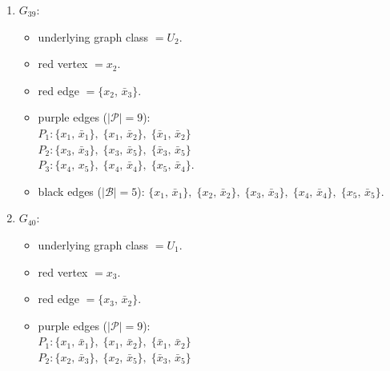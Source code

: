 \begin{enumerate}[leftmargin=*]
\begin{itemize}[leftmargin=*]
\item purple edges ($|\mathcal{P}|=9$):\mbox{}\\
$P_{1}: \{x_{1},\,\bar{x}_{1}\},\; \{x_{1},\,\bar{x}_{2}\},\; \{\bar{x}_{1},\,\bar{x}_{2}\}$\\
$P_{2}: \{x_{3},\,\bar{x}_{3}\},\; \{x_{3},\,\bar{x}_{5}\},\; \{\bar{x}_{3},\,\bar{x}_{5}\}$\\
$P_{3}: \{x_{4},\,x_{5}\},\; \{x_{4},\,\bar{x}_{4}\},\; \{x_{5},\,\bar{x}_{4}\}$.
\item black edges ($|\mathcal{B}|=5$): $\{x_{1},\,\bar{x}_{1}\},\; \{x_{2},\,\bar{x}_{2}\},\; \{x_{3},\,\bar{x}_{3}\},\; \{x_{4},\,\bar{x}_{4}\},\; \{x_{5},\,\bar{x}_{5}\}$.
\end{itemize}
\item $G_{39}$:
\begin{itemize}[leftmargin=*]
\item underlying graph class $= U_2$.
\item red vertex $= x_{2}$.
\item red edge $= \{x_{2},\,\bar{x}_{3}\}$.
\item purple edges ($|\mathcal{P}|=9$):\mbox{}\\
$P_{1}: \{x_{1},\,\bar{x}_{1}\},\; \{x_{1},\,\bar{x}_{2}\},\; \{\bar{x}_{1},\,\bar{x}_{2}\}$\\
$P_{2}: \{x_{3},\,\bar{x}_{3}\},\; \{x_{3},\,\bar{x}_{5}\},\; \{\bar{x}_{3},\,\bar{x}_{5}\}$\\
$P_{3}: \{x_{4},\,x_{5}\},\; \{x_{4},\,\bar{x}_{4}\},\; \{x_{5},\,\bar{x}_{4}\}$.
\item black edges ($|\mathcal{B}|=5$): $\{x_{1},\,\bar{x}_{1}\},\; \{x_{2},\,\bar{x}_{2}\},\; \{x_{3},\,\bar{x}_{3}\},\; \{x_{4},\,\bar{x}_{4}\},\; \{x_{5},\,\bar{x}_{5}\}$.
\end{itemize}
\item $G_{40}$:
\begin{itemize}[leftmargin=*]
\item underlying graph class $= U_1$.
\item red vertex $= x_{3}$.
\item red edge $= \{x_{3},\,\bar{x}_{2}\}$.
\item purple edges ($|\mathcal{P}|=9$):\mbox{}\\
$P_{1}: \{x_{1},\,\bar{x}_{1}\},\; \{x_{1},\,\bar{x}_{2}\},\; \{\bar{x}_{1},\,\bar{x}_{2}\}$\\
$P_{2}: \{x_{2},\,\bar{x}_{3}\},\; \{x_{2},\,\bar{x}_{5}\},\; \{\bar{x}_{3},\,\bar{x}_{5}\}$\\

\end{itemize}
\end{enumerate}
